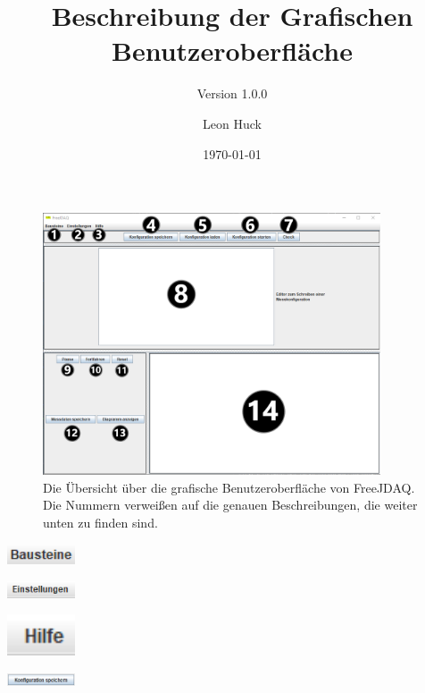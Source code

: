 \documentclass[parskip=full]{scrartcl}
\title{Beschreibung der Grafischen Benutzeroberfläche}
\subtitle{Version 1.0.0}
\author{Leon Huck}
\date{\today}
\begin{document}

\begin{figure}[htbp]
    \begin{center}
        \includegraphics[width = 10cm]{Grafiken/Uebersicht_GUI_Mit_Nummern.png}
        \caption{Die Übersicht über die grafische Benutzeroberfläche von FreeJDAQ. Die Nummern verweißen auf die genauen Beschreibungen, die weiter unten zu finden sind.}
        \label{Uebersicht_GUI_Mit_Nummern}
    \end{center}
\end{figure}

\begin{center}
    \includegraphics[width = 2cm]{Grafiken/1-Bausteine.png}
\end{center}

\begin{center}
    \includegraphics[width = 2cm]{Grafiken/2-Einstellungen.png}
\end{center}

\begin{center}
    \includegraphics[width = 2cm]{Grafiken/3-Hilfe.png}
\end{center}

\begin{center}
    \includegraphics[width = 2cm]{Grafiken/4-Konfiguration_speichern.png}
\end{center}
\end{document}
